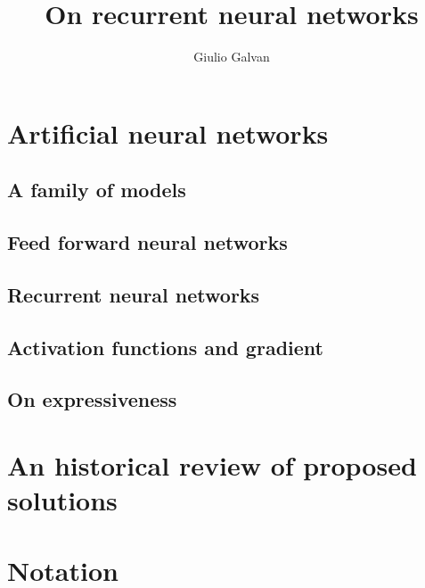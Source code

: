 \documentclass{book}
\title{On recurrent neural networks}
\author{Giulio Galvan}
\theoremstyle{definition}
\theoremstyle{definition}
\theoremstyle{definition}
\begin{document}
\maketitle
\tableofcontents
\chapter{Artificial neural networks}
  \section{A family of models}
  
  \section{Feed forward neural networks}
  
  \section{Recurrent neural networks}
  
  \section{Activation functions and gradient}
  
  \section{On expressiveness}
  
\chapter{An historical review of proposed solutions}
  
  

%   

\appendix
\chapter{Notation}



\newpage
{}

\end{document}
